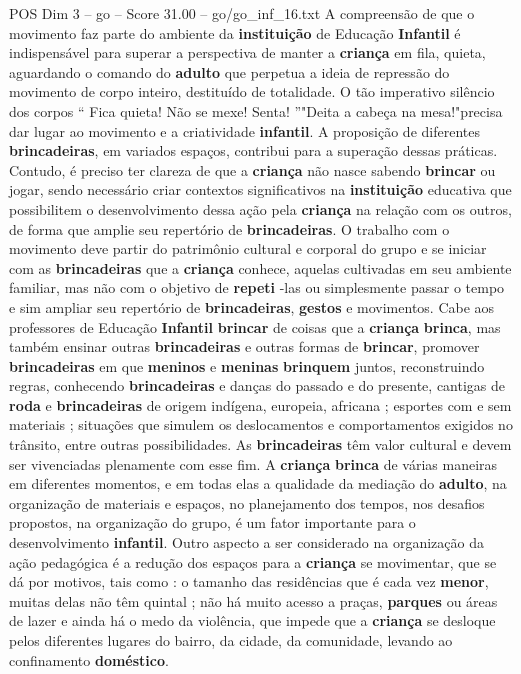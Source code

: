\begin{textsample}{POS Dim 3 – go – Score 31.00 – go/go\_inf\_16.txt}
A compreensão de que o movimento faz parte do ambiente da \textbf{instituição} de Educação \textbf{Infantil} é indispensável para superar a perspectiva de manter a \textbf{criança} em fila, quieta, aguardando o comando do \textbf{adulto} que perpetua a ideia de repressão do movimento de corpo inteiro, destituído de totalidade.
O tão imperativo silêncio dos corpos “ Fica quieta!
Não se mexe!
Senta! ”"Deita a cabeça na mesa!"precisa dar lugar ao movimento e a criatividade \textbf{infantil}.
A proposição de diferentes \textbf{brincadeiras}, em variados espaços, contribui para a superação dessas práticas.
Contudo, é preciso ter clareza de que a \textbf{criança} não nasce sabendo \textbf{brincar} ou jogar, sendo necessário criar contextos significativos na \textbf{instituição} educativa que possibilitem o desenvolvimento dessa ação pela \textbf{criança} na relação com os outros, de forma que amplie seu repertório de \textbf{brincadeiras}.
O trabalho com o movimento deve partir do patrimônio cultural e corporal do grupo e se iniciar com as \textbf{brincadeiras} que a \textbf{criança} conhece, aquelas cultivadas em seu ambiente familiar, mas não com o objetivo de \textbf{repeti} -las ou simplesmente passar o tempo e sim ampliar seu repertório de \textbf{brincadeiras}, \textbf{gestos} e movimentos.
Cabe aos professores de Educação \textbf{Infantil} \textbf{brincar} de coisas que a \textbf{criança} \textbf{brinca}, mas também ensinar outras \textbf{brincadeiras} e outras formas de \textbf{brincar}, promover \textbf{brincadeiras} em que \textbf{meninos} e \textbf{meninas} \textbf{brinquem} juntos, reconstruindo regras, conhecendo \textbf{brincadeiras} e danças do passado e do presente, cantigas de \textbf{roda} e \textbf{brincadeiras} de origem indígena, europeia, africana ; esportes com e sem materiais ; situações que simulem os deslocamentos e comportamentos exigidos no trânsito, entre outras possibilidades.
As \textbf{brincadeiras} têm valor cultural e devem ser vivenciadas plenamente com esse fim.
A \textbf{criança} \textbf{brinca} de várias maneiras em diferentes momentos, e em todas elas a qualidade da mediação do \textbf{adulto}, na organização de materiais e espaços, no planejamento dos tempos, nos desafios propostos, na organização do grupo, é um fator importante para o desenvolvimento \textbf{infantil}.
Outro aspecto a ser considerado na organização da ação pedagógica é a redução dos espaços para a \textbf{criança} se movimentar, que se dá por motivos, tais como : o tamanho das residências que é cada vez \textbf{menor}, muitas delas não têm quintal ; não há muito acesso a praças, \textbf{parques} ou áreas de lazer e ainda há o medo da violência, que impede que a \textbf{criança} se desloque pelos diferentes lugares do bairro, da cidade, da comunidade, levando ao confinamento \textbf{doméstico}.

\end{textsample}
